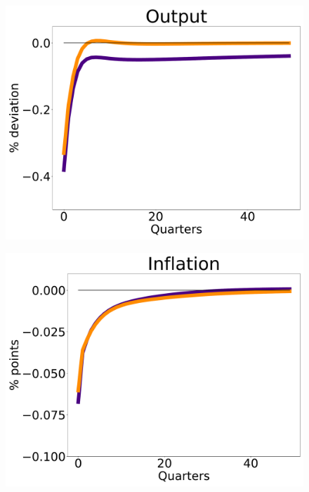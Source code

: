 \begin{figure}[htb]
\begin{minipage}{0.33\textwidth}
  \includegraphics[scale=.14]{text/chapter1/Figures/IPRs_ev/Y_IPR_ev}
  \label{fig:3}
\end{minipage}
\begin{minipage}{0.33\textwidth}
  \includegraphics[scale=.14]{text/chapter1/Figures/IPRs_ev/pi_IPR_ev}
  \label{fig:4}
\end{minipage}
\medskip
\begin{minipage}{0.33\textwidth}

\end{minipage}
\end{figure}
